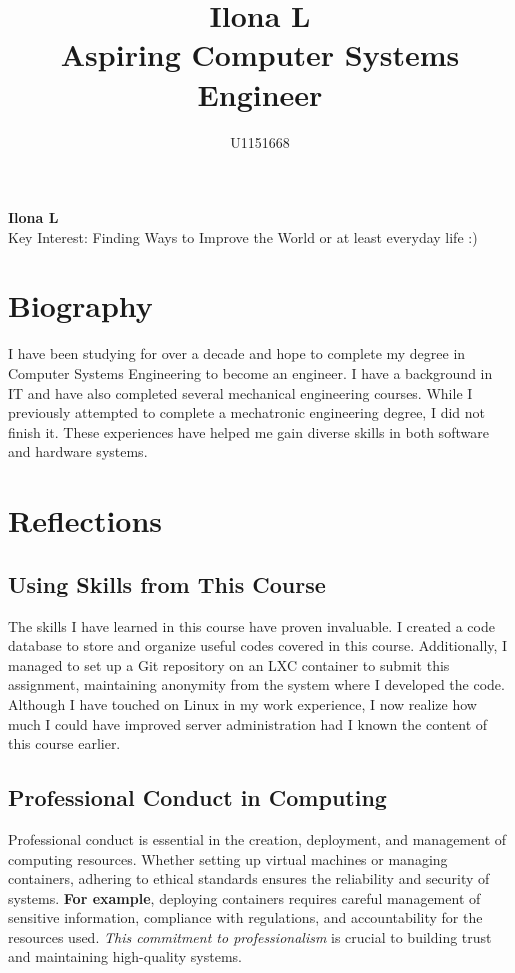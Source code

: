 \documentclass[12pt,a4paper]{article}
\title{\textbf{Ilona L} \\ Aspiring Computer Systems Engineer}
\author{U1151668}
\date{}
\begin{document}
\begin{center}
    \Huge{\textbf{Ilona L}} \\[1cm]
    \Large{Key Interest: Finding Ways to Improve the World or at least everyday life :)}
\end{center}

\vspace{1cm} %

\section*{Biography}
I have been studying for over a decade and hope to complete my degree in Computer Systems Engineering to become an engineer. I have a background in IT and have also completed several mechanical engineering courses. While I previously attempted to complete a mechatronic engineering degree, I did not finish it. These experiences have helped me gain diverse skills in both software and hardware systems.

\section*{Reflections}

\subsection*{Using Skills from This Course}
The skills I have learned in this course have proven invaluable. I created a code database to store and organize useful codes covered in this course. Additionally, I managed to set up a Git repository on an LXC container to submit this assignment, maintaining anonymity from the system where I developed the code. Although I have touched on Linux in my work experience, I now realize how much I could have improved server administration had I known the content of this course earlier.

\subsection*{Professional Conduct in Computing}
Professional conduct is essential in the creation, deployment, and management of computing resources. Whether setting up virtual machines or managing containers, adhering to ethical standards ensures the reliability and security of systems. \textbf{For example}, deploying containers requires careful management of sensitive information, compliance with regulations, and accountability for the resources used. \textit{This commitment to professionalism} is crucial to building trust and maintaining high-quality systems.
\end{document}

